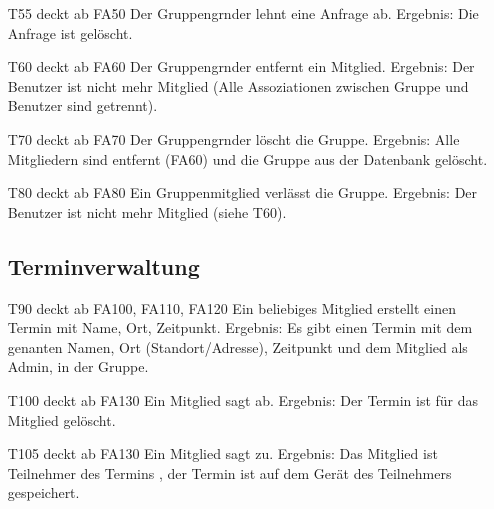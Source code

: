 \documentclass{scrartcl}
\begin{document}
\begin{itemize}
		\item[T55] deckt ab FA50  \newline
		Der \gls{Gruppengrnder} lehnt eine Anfrage ab. \newline
		Ergebnis: Die Anfrage ist gelöscht.

		\item[T60] deckt ab FA60  \newline
		Der \gls{Gruppengrnder} entfernt ein Mitglied.  \newline
		Ergebnis: Der Benutzer ist nicht mehr Mitglied (Alle Assoziationen zwischen Gruppe und Benutzer sind getrennt).

		\item[T70] deckt ab FA70  \newline
		Der \gls{Gruppengrnder} löscht die Gruppe.  \newline
		Ergebnis: Alle Mitgliedern sind entfernt (FA60) und die Gruppe aus der Datenbank gelöscht.

		\item[T80] deckt ab FA80  \newline
		Ein Gruppenmitglied verlässt die Gruppe.  \newline
		Ergebnis: Der Benutzer ist nicht mehr \gls{Mitglied} (siehe T60).

	\subsection{Terminverwaltung}

		\item[T90] deckt ab FA100, FA110, FA120  \newline
		Ein beliebiges \gls{Mitglied} erstellt einen Termin mit Name, Ort, Zeitpunkt.  \newline
		Ergebnis: Es gibt einen Termin mit dem genanten Namen, Ort (Standort/Adresse), Zeitpunkt und dem Mitglied als 				Admin, in der Gruppe.
		
		\item [T100] deckt ab FA130  \newline
		Ein \gls{Mitglied} sagt ab.  \newline
		Ergebnis: Der Termin ist für das Mitglied gelöscht.

		\item[T105] deckt ab FA130  \newline
		Ein Mitglied sagt zu.  \newline
		Ergebnis: Das Mitglied ist \gls{Teilnehmer} des Termins , der Termin ist auf dem Gerät des Teilnehmers gespeichert.


\end{itemize}
\end{document}
